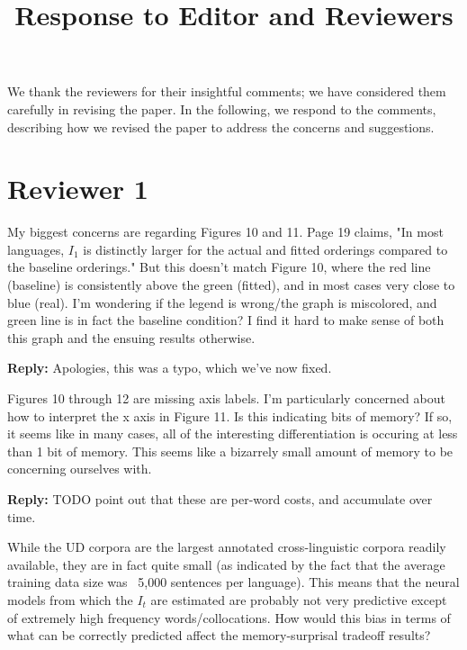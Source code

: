\documentclass{article}[11pt,a4paper,oneside]
\title{Response to Editor and Reviewers}
\newenvironment{reply}
  {\par\medskip
   \color{blue}%
   \begin{framed}
   \textbf{Reply: }\ignorespaces}
 {\end{framed}
  \medskip}
\begin{document}
\maketitle

We thank the reviewers for their insightful comments; we have considered them carefully in revising the paper. In the following, we respond to the comments, describing how we revised the paper to address the concerns and suggestions.



\section{Reviewer 1}



My biggest concerns are regarding Figures 10 and 11. Page 19 claims, "In most languages, $I_1$ is distinctly larger for the actual and fitted orderings compared to the baseline orderings." But this doesn't match Figure 10, where the red line (baseline) is consistently above the green (fitted), and in most cases very close to blue (real). I'm wondering if the legend is wrong/the graph is miscolored, and green line is in fact the baseline condition? I find it hard to make sense of both this graph and the ensuing results otherwise.

\begin{reply}
Apologies, this was a typo, which we've now fixed.
\end{reply}

Figures 10 through 12 are missing axis labels. I'm particularly concerned about how to interpret the x axis in Figure 11. Is this indicating bits of memory? If so, it seems like in many cases, all of the interesting differentiation is occuring at less than 1 bit of memory. This seems like a bizarrely small amount of memory to be concerning ourselves with.

\begin{reply}
	TODO point out that these are per-word costs, and accumulate over time. 
\end{reply}

While the UD corpora are the largest annotated cross-linguistic corpora readily available, they are in fact quite small (as indicated by the fact that the average training data size was ~5,000 sentences per language). This means that the neural models from which the $I_t$ are estimated are probably not very predictive except of extremely high frequency words/collocations. How would this bias in terms of what can be correctly predicted affect the memory-surprisal tradeoff results?
\end{document}
